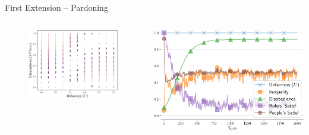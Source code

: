 \documentclass[xcolor={table}]{beamer}
\begin{document}
\begin{frame}[fragile=singleslide,t]
\begin{columns}[T]
\begin{column}{.58\textwidth}
\begin{block}{First Extension -- Pardoning}
\begin{columns}[c]
\begin{column}{.6\textwidth}
\begin{figure}
  \centering
  \includegraphics[width=1.0\linewidth]{img/phaseext1.pdf}
\end{figure}

\end{column}
\begin{column}{.4\textwidth}



  \includegraphics[width=0.9\linewidth]{img/timerevolution.pdf}


\end{column}
\end{columns}
\end{block}
\end{column}
\end{columns}
\end{frame}
\end{document}
